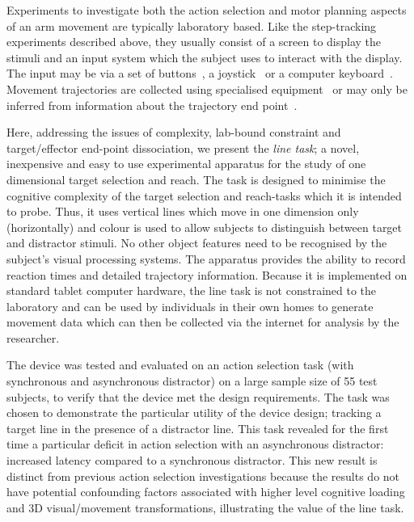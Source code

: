 \documentclass[10pt,letterpaper]{article}
\begin{document}
Experiments to investigate both the action selection and motor
planning aspects of an arm movement are typically laboratory
based. Like the step-tracking experiments described above, they
usually consist of a screen to display the stimuli and an input system
which the subject uses to interact with the display. The input may be
via a set of
buttons~\cite{tipper_selective_1992,waszak_intention-based_2005}, a
joystick~\cite{pratt_action-centered_1994} or a computer
keyboard~\cite{elsner_effect_2001}. Movement trajectories are
collected using specialised
equipment~\cite{song_target_2008,jax_hand_2007} or may only be
inferred from information about the trajectory end
point~\cite{pratt_action-centered_1994}.

Here, addressing the issues of complexity, lab-bound constraint and
target/effector end-point dissociation, we present the \emph{line
  task}; a novel, inexpensive and easy to use experimental apparatus
for the study of one dimensional target selection and reach. The task
is designed to minimise the cognitive complexity of the target
selection and reach-tasks which it is intended to probe. Thus, it uses
vertical lines which move in one dimension only (horizontally) and
colour is used to allow subjects to distinguish between target and
distractor stimuli. No other object features need to be recognised by
the subject's visual processing systems. The apparatus provides the
ability to record reaction times and detailed trajectory
information. Because it is implemented on standard tablet computer
hardware, the line task is not constrained to the laboratory and can
be used by individuals in their own homes to generate movement data
which can then be collected via the internet for analysis by the
researcher.

The device was tested and evaluated on an action selection task (with
synchronous and asynchronous distractor) on a large sample size of 55
test subjects, to verify that the device met the design
requirements. The task was chosen to demonstrate the particular
utility of the device design; tracking a target line in the presence
of a distractor line. This task revealed for the first time a
particular deficit in action selection with an asynchronous
distractor: increased latency compared to a synchronous
distractor. This new result is distinct from previous action selection
investigations because the results do not have potential confounding
factors associated with higher level cognitive loading and 3D
visual/movement transformations, illustrating the value of the line
task.
\end{document}
